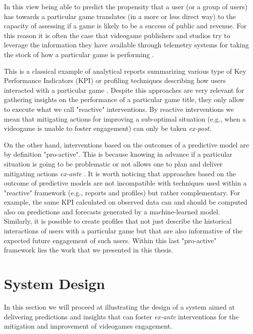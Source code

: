 In this view being able to predict the propensity that a user (or a group of users) has towards a particular game translates (in a more or less direct way) to the capacity of assessing if a game is likely to be a success of public and revenue. For this reason it is often the case that videogame publishers and studios try to leverage the information they have available through telemetry systems for taking the stock of how a particular game is performing \cite{el2016game}. 

This is a classical example of analytical reports summarizing various type of Key Performance Indicators (KPI)\cite{el2016game} or profiling techniques describing how users interacted with a particular game \cite{el2016game}. Despite this approaches are very relevant for gathering insights on the performance of a particular game title, they only allow to execute what we call "reactive" interventions. By reactive interventions we mean that mitigating actions for improving a sub-optimal situation (e.g., when a videogame is unable to foster engagement) can only be taken \textit{ex-post}.

On the other hand, interventions based on the outcomes of a predictive model are by definition "pro-active". This is because knowing in advance if a particular situation is going to be problematic or not allows one to plan and deliver mitigating actions \textit{ex-ante} \cite{el2016game, el2021game}. It is worth noticing that approaches based on the outcome of predictive models are not incompatible with techniques used within a "reactive" framework (e.g., reports and profiles) but rather complementary. For example, the same KPI calculated on observed data can and should be computed also on predictions and forecasts generated by a machine-learned model. Similarly, it is possible to create profiles that not just describe the historical interactions of users with a particular game but that are also informative of the expected future engagement of such users. Within this last "pro-active" framework lies the work that we presented in this thesis. 

\section{System Design}
\label{pipeline}

In this section we will proceed at illustrating the design of a system aimed at delivering predictions and insights that can foster \textit{ex-ante} interventions for the mitigation and improvement of videogames engagement. 

